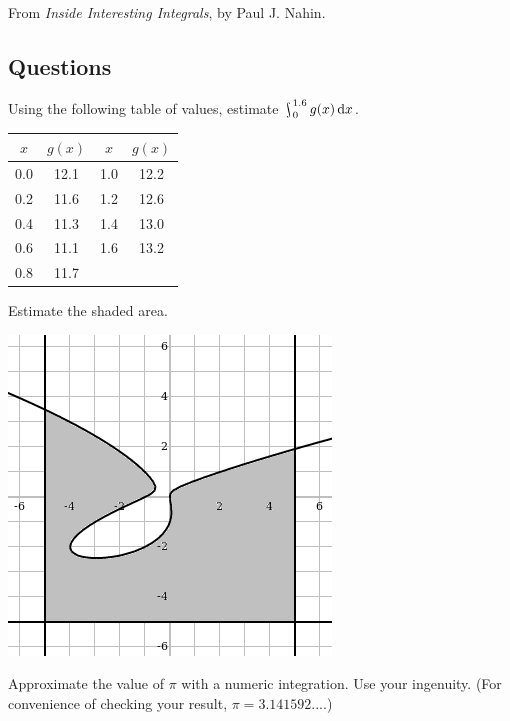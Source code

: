 \begin{flushright}
  From \textit{Inside Interesting Integrals}, by Paul J. Nahin.
\end{flushright}

\subsection*{Questions}
\begin{questions}
  \question Using the following table of values, estimate $ \rint^{1.6}_0 g(x) \dif{x} $.
            \begin{center}
              \begin{tabular}{|c|c||c|c|}\hline
                $ x $ & $ g(x) $ & $ x $ & $ g(x) $\\\hline
                0.0 & 12.1 & 1.0 & 12.2\\
                0.2 & 11.6 & 1.2 & 12.6\\
                0.4 & 11.3 & 1.4 & 13.0\\
                0.6 & 11.1 & 1.6 & 13.2\\
                0.8 & 11.7 &&\\\hline
              \end{tabular}
            \end{center}
  \question Estimate the shaded area.
            \begin{center}
              \includegraphics[width=0.3\linewidth]{aahw}
            \end{center}
  \question Approximate the value of $ \pi $ with a numeric integration. Use your ingenuity. (For convenience of checking your result, $\pi = 3.141592... $.)
\end{questions}


